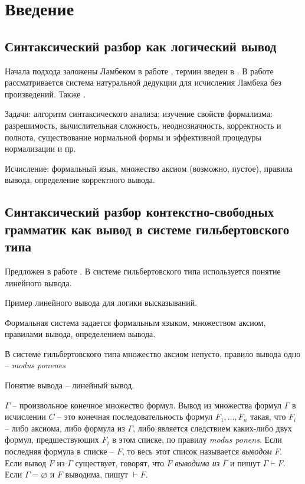 \chapter{Введение}

\section{Синтаксический разбор как логический вывод}

Начала подхода заложены Ламбеком в работе \parencite{lambek1958mathematics}, термин введен в \parencite{pereira1983parsing}. В работе \parencite{konig1989parsing} рассматривается система натуральной дедукции для исчисления Ламбека без произведений. Также \parencite{moot2012logic}.

Задачи: алгоритм синтаксического анализа; изучение свойств формализма: разрешимость, вычислительная сложность, неоднозначность, корректность и полнота, существование нормальной формы и эффективной процедуры нормализации и пр.

Исчисление: формальный язык, множество аксиом (возможно, пустое), правила вывода, определение корректного вывода.

\section{Синтаксический разбор контекстно-свободных грамматик как вывод в системе гильбертовского типа}

Предложен в работе \parencite{pereira1983parsing}. В системе гильбертовского типа используется понятие линейного вывода.

Пример линейного вывода для логики высказываний.

Формальная система задается формальным языком, множеством аксиом, правилами вывода, определением вывода.

В системе гильбертовского типа 
множество аксиом непусто,
правило вывода одно -- \textit{modus ponenes}

\begin{prooftree}
\end{prooftree}

Понятие вывода -- линейный вывод.

$\Gamma$ -- произвольное конечное множество формул. Вывод из множества формул $\Gamma$ в исчислении $C$ -- это конечная последовательность формул $F_1, \dots, F_n$ такая, что $F_i$ -- либо аксиома, либо формула из $\Gamma$, либо является следствием каких-либо двух формул, предшествующих $F_i$ в этом списке, по правилу \textit{modus ponens}. Если последняя формула в списке -- $F$, то весь этот список называется \textit{выводом} $F$. Если вывод $F$ из $\Gamma$ существует, говорят, что $F$ \textit{выводима из} $\Gamma$ и пишут $\Gamma \vdash F$. Если $\Gamma = \varnothing$ и $F$ выводима, пишут $\vdash F$.

